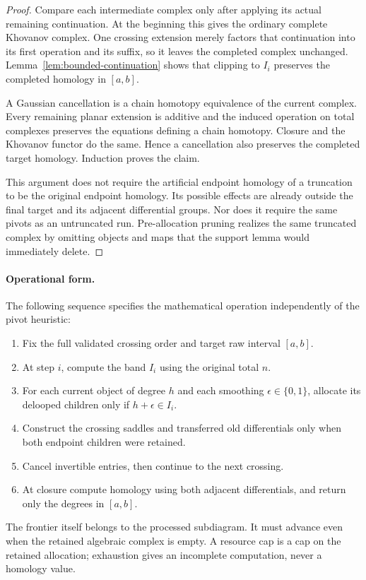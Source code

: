 \begin{proof}
Compare each intermediate complex only after applying its actual remaining
continuation.  At the beginning this gives the ordinary complete Khovanov
complex.  One crossing extension merely factors that continuation into its
first operation and its suffix, so it leaves the completed complex
unchanged.  Lemma~\ref{lem:bounded-continuation} shows that clipping to
$I_i$ preserves the completed homology in $[a,b]$.

A Gaussian cancellation is a chain homotopy equivalence of the current
complex.  Every remaining planar extension is additive and the induced
operation on total complexes preserves the equations defining a chain
homotopy.  Closure and the Khovanov functor do the same.  Hence a cancellation
also preserves the completed target homology.  Induction proves the claim.

This argument does not require the artificial endpoint homology of a
truncation to be the original endpoint homology.  Its possible effects are
already outside the final target and its adjacent differential groups.
Nor does it require the same pivots as an untruncated run.  Pre-allocation
pruning realizes the same truncated complex by omitting objects and maps
that the support lemma would immediately delete.
\end{proof}

\paragraph{Operational form.}
The following sequence specifies the mathematical operation independently
of the pivot heuristic:
\begin{enumerate}
\item Fix the full validated crossing order and target raw interval $[a,b]$.
\item At step $i$, compute the band $I_i$ using the original total $n$.
\item For each current object of degree $h$ and each smoothing
  $\epsilon\in\{0,1\}$, allocate its delooped children only if
  $h+\epsilon\in I_i$.
\item Construct the crossing saddles and transferred old differentials only
  when both endpoint children were retained.
\item Cancel invertible entries, then continue to the next crossing.
\item At closure compute homology using both adjacent differentials, and
  return only the degrees in $[a,b]$.
\end{enumerate}
The frontier itself belongs to the processed subdiagram.  It must advance
even when the retained algebraic complex is empty.  A resource cap is a cap
on the retained allocation; exhaustion gives an incomplete computation,
never a homology value.

